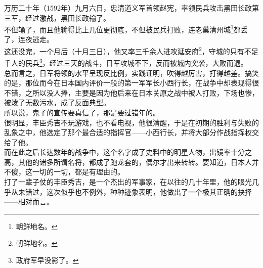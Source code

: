\begin{multicols}{\theparacolNo}
万历二十年（1592年）九月六日，忠清道义军首领赵宪，率领民兵攻击黑田长政第三军，经过激战，黑田长政输了。\\

不但输了，而且他输得比上几位更彻底，不但被民兵打败，连老巢清州城\footnote{朝鲜地名。}都丢了，连夜逃走。\\

这还没完，一个月后（十月三日），他又率三千余人进攻延安府\footnote{朝鲜地名。}，守城的只有不足千人的民兵\footnote{政府军早没影了。}，经过三天的战斗，日军攻城不下，反而被城内突袭，大败而退。\\

总而言之，日军将领的水平呈现反比例，实践证明，吹得越厉害，打得越差。搞笑的是，那位而今在日本国内评价一般的第一军军长小西行长，在战争中却表现得很不错，之所以没人捧，主要是因为他后来在日本关原之战中被人打败，下场也惨，被泼了无数污水，成了反面典型。\\

所以说，鬼子的宣传要真信了，那是要过错年的。\\

很明显，丰臣秀吉不玩游戏，也不看电视，他很清醒，于是在初期的胜利与失败的乱象之中，他选定了那个最合适的指挥官——小西行长，并将大部分作战指挥权交给了他。\\

而在此之后长达数年的战争中，这个名字成了史料中的明星人物，出镜率十分之高，其他的诸多所谓名将，都成了跑龙套的，偶尔才出来转转。要知道，日本人并不傻，这一切的一切，都是有理由的。\\

打了一辈子仗的丰臣秀吉，是一个杰出的军事家，在以往的几十年里，他的眼光几乎从未错过，这次似乎也不例外，种种迹象表明，他做出了一个极其正确的抉择——相对而言。\\

\ifnum{}
	\end{multicols}
\fi
\newpage


